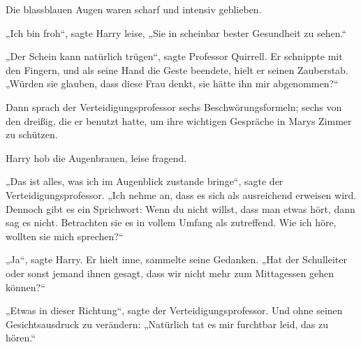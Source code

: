 Die blassblauen Augen waren scharf und intensiv geblieben.

„Ich bin froh“, sagte Harry leise,
„Sie in scheinbar bester Gesundheit zu sehen.“

„Der Schein kann natürlich trügen“, sagte Professor Quirrell. Er schnippte mit den Fingern, und als seine Hand die Geste beendete, hielt er seinen Zauberstab.
„Würden sie glauben, dass diese Frau denkt, sie hätte ihn mir abgenommen?“

Dann sprach der Verteidigungsprofessor sechs Beschwörungsformeln; sechs von den dreißig, die er benutzt hatte, um ihre wichtigen Gespräche in Marys Zimmer zu schützen.

Harry hob die Augenbrauen, leise fragend.

„Das ist alles, was ich im Augenblick zustande bringe“, sagte der Verteidigungsprofessor.
„Ich nehme an, dass es sich als ausreichend erweisen wird. Dennoch gibt es ein Sprichwort: Wenn du nicht willst, dass man etwas hört, dann sag es nicht. Betrachten sie es in vollem Umfang als zutreffend. Wie ich höre, wollten sie mich sprechen?“

„Ja“, sagte Harry. Er hielt inne, sammelte seine Gedanken.
„Hat der Schulleiter oder sonst jemand ihnen gesagt, dass wir nicht mehr zum Mittagessen gehen können?“

„Etwas in dieser Richtung“, sagte der Verteidigungsprofessor. Und ohne seinen Gesichtsausdruck zu verändern:
„Natürlich tat es mir furchtbar leid, das zu hören.“

